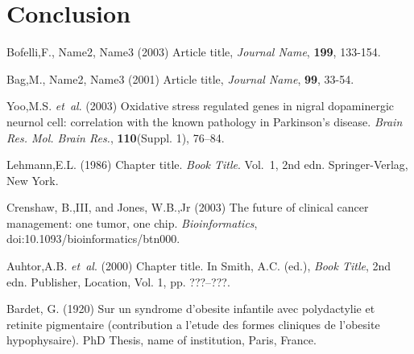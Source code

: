 \documentclass{bioinfo}
\begin{document}
\section{Conclusion}

%
%
%
%
%
%
%
%
%


\begin{thebibliography}{}
 Bofelli,F., Name2, Name3 (2003) Article title, {\it Journal Name}, {\bf 199}, 133-154.

 Bag,M., Name2, Name3 (2001) Article title, {\it Journal Name}, {\bf 99}, 33-54.

Yoo,M.S. \textit{et~al}. (2003) Oxidative stress regulated genes
in nigral dopaminergic neurnol cell: correlation with the known
pathology in Parkinson's disease. \textit{Brain Res. Mol. Brain
Res.}, \textbf{110}(Suppl. 1), 76--84.

Lehmann,E.L. (1986) Chapter title. \textit{Book Title}. Vol.~1, 2nd edn. Springer-Verlag, New York.

Crenshaw, B.,III, and Jones, W.B.,Jr (2003) The future of clinical
cancer management: one tumor, one chip. \textit{Bioinformatics},
doi:10.1093/bioinformatics/btn000.

Auhtor,A.B. \textit{et~al}. (2000) Chapter title. In Smith, A.C.
(ed.), \textit{Book Title}, 2nd edn. Publisher, Location, Vol. 1, pp.
???--???.

Bardet, G. (1920) Sur un syndrome d'obesite infantile avec
polydactylie et retinite pigmentaire (contribution a l'etude des
formes cliniques de l'obesite hypophysaire). PhD Thesis, name of
institution, Paris, France.

\end{thebibliography}
\end{document}
